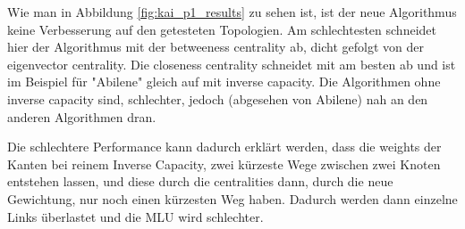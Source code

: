 \documentclass[sigconf, nonacm, review]{acmart}
\begin{document}
Wie man in Abbildung \ref{fig:kai_p1_results} zu sehen ist, ist der neue Algorithmus keine Verbesserung auf den getesteten Topologien.
Am schlechtesten schneidet hier der Algorithmus mit der betweeness centrality ab, dicht gefolgt von der eigenvector centrality.
Die closeness centrality schneidet mit am besten ab und ist im Beispiel f\"ur "Abilene" gleich auf mit inverse capacity.
Die Algorithmen ohne inverse capacity sind, schlechter, jedoch (abgesehen von Abilene) nah an den anderen Algorithmen dran.

Die schlechtere Performance kann dadurch erkl\"art werden, dass die weights der Kanten bei reinem Inverse Capacity, zwei k\"urzeste Wege zwischen zwei Knoten entstehen lassen, und diese durch die centralities dann, durch die neue Gewichtung, nur noch einen k\"urzesten Weg haben.
Dadurch werden dann einzelne Links \"uberlastet und die MLU wird schlechter.
\end{document}

